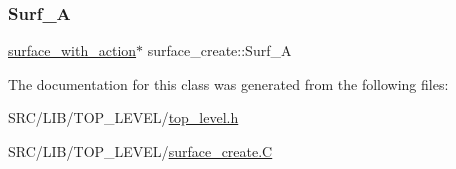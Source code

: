 \subsubsection{\texorpdfstring{Surf\+\_\+A}{Surf\_A}}
{\footnotesize\ttfamily \mbox{\hyperlink{classsurface__with__action}{surface\+\_\+with\+\_\+action}}$\ast$ surface\+\_\+create\+::\+Surf\+\_\+A}



The documentation for this class was generated from the following files\+:\begin{DoxyCompactItemize}
\item 
S\+R\+C/\+L\+I\+B/\+T\+O\+P\+\_\+\+L\+E\+V\+E\+L/\mbox{\hyperlink{top__level_8h}{top\+\_\+level.\+h}}\item 
S\+R\+C/\+L\+I\+B/\+T\+O\+P\+\_\+\+L\+E\+V\+E\+L/\mbox{\hyperlink{surface__create_8_c}{surface\+\_\+create.\+C}}\end{DoxyCompactItemize}

